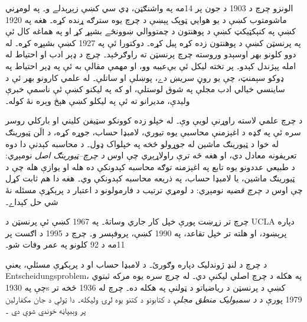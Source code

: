 \documentclass[../../../include/open-logic-section]{subfiles}
\begin{document}



الونزو چرچ د 1903 د جون پر 14مه په واشنګټن، ډي سي
کښې زېږېدلے و۔ په لومړني ماشومتوب کښې د يو هوايي
ټوپک پېښې د چرچ يوه سترګه ړنده کړه۔ هغه په 1920
کښې په کنېکټيکټ کښې د پوهنتون د چمتووالي ښوونځے
بشپړ کړ او په هماغه کال ئې په پرنسټن کښې د
پوهنتون زده کړه پيل کړه۔ دوکتورا ئې په 1927
کښې بشپړه کړه۔ له دوو کلونو بهر اوسېدو وروسته
چرچ پرنسټن ته راوګرځېد۔ چرچ د ډېر ادب او
احتياط له امله پېژندل کېدو۔ پر تخته ليکل ئې
بې‌عيبه وو، او مهمې مقالې به ئې په ډېر احتياط
په ډوکو سېمنټ، چې يو روڼ سريښ دے، پوښلې او
ساتلې۔ له علمي کارونو بهر ئې د ساينسي خيالي ادب
مجلې په شوق لوستلې، او که په ليکنو کښې ئې
ناسمې خبرې وليدې، مديرانو ته ئې په ليکلو
کښې هېڅ وېره نۀ کوله۔

د چرچ علمي لاسته راوړنې لويې وې۔ له خپلو
زده کوونکو سټيفن کليني او بارکلي روسر سره
ئې په ګډه د اغېزمنې محاسبې يوه تيوري،
لامبډا حساب، جوړه کړه، د الَن ټيورينګ له
خوا د ټيورينګ ماشين له جوړولو څخه په
خپلواک ډول۔ د محاسبه کېدنې دا دوه
تعريفونه معادل دي، او هغه څه ترې
راولاړېږي چې اوس \emph{د چرچ--ټيورينګ اصل}
نومېږي: د طبيعي عددونو يوه تابع په
اغېزمنه توګه محاسبه کېدونکې ده هله او
يوازې هله چې د ټيورينګ ماشين، يا
لامبډا حساب، په ذريعه محاسبه کېدونکې
وي۔ هغه دا هم ثابت کړل چې اوس
\emph{د چرچ قضيه} نومېږي: د لومړي
ترتيب د فارمولونو د اعتبار د پرېکړې
مسئله نۀ شي حل کېداے۔

چرچ تر زړښت پورې خپل کار جاري وساتۀ۔
په 1967 کښې ئې پرنسټن د UCLA دپاره
پرېښود، او هلته تر خپل تقاعد، په
1990 کښې، پروفېسر و۔ چرچ د 1995
د اګست پر 11مه د 92 کلونو په عمر
وفات شو۔

\begin{reading}
د چرچ د لنډ ژوندليک دپاره
\citet{EndertonND} وګورئ۔ د لامبډا
حساب او د پرېکړې مسئلې، يعنې
Entscheidungsproblem، په هکله د
چرچ اصلي ليکنې
\citet{Church1936,Church1936a} دي۔
\citet{Aspray1984} له چرچ سره يوه
مرکه ثبتوي چې په 1930s کښې د
پرنسټن د رياضياتو د ټولنې په
هکله ده۔ چرچ له 1936 څخه تر
1979 پورې د \emph{د سمبوليک
منطق مجلې} د کتابونو د کتنو
يوه لړۍ وليکله۔ دا ټولې د
جان مکفارلېن پر وېبپاڼه
خوندي شوې دي \citep{MacFarlane2015}۔
\end{reading}
\end{document}
